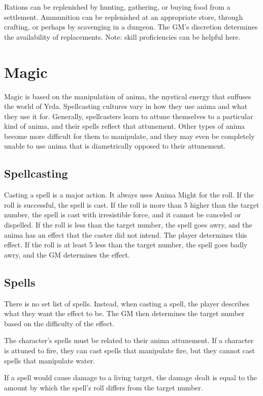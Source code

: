 \begin{multicols}{2}
Rations can be replenished by hunting, gathering, or buying food from a settlement. Ammunition
can be replenished at an appropriate store, through crafting, or perhaps by scavenging in a dungeon. The GM's discretion
determines the availability of replacements. Note: skill proficiencies can be helpful here.

\section{Magic}

Magic is based on the manipulation of anima, the mystical energy that suffuses the world of Yrda.
Spellcasting cultures vary in how they use anima and what they use it for. Generally, spellcasters
learn to attune themselves to a particular kind of anima, and their spells reflect that attunement.
Other types of anima become more difficult for them to manipulate, and they may even be completely
unable to use anima that is diametrically opposed to their attunement.

\subsection{Spellcasting}

Casting a spell is a major action. It always uses Anima Might for the roll. If the roll is successful,
the spell is cast. If the roll is more than 5 higher than the target number, the spell is cast with
irresistible force, and it cannot be canceled or dispelled. If the roll is less than the target number,
the spell goes awry, and the anima has an effect that the caster did not intend. The player determines
this effect. If the roll is at least 5 less than the target number, the spell goes badly awry, and the GM
determines the effect.

\subsection{Spells}

There is no set list of spells. Instead, when casting a spell, the player describes what they want the
effect to be. The GM then determines the target number based on the difficulty of the effect.

The character's spells must be related to their anima attunement. If a character is attuned to fire,
they can cast spells that manipulate fire, but they cannot cast spells that manipulate water.

If a spell would cause damage to a living target, the damage dealt is equal to the amount by which the
spell's roll differs from the target number.


\end{multicols}
